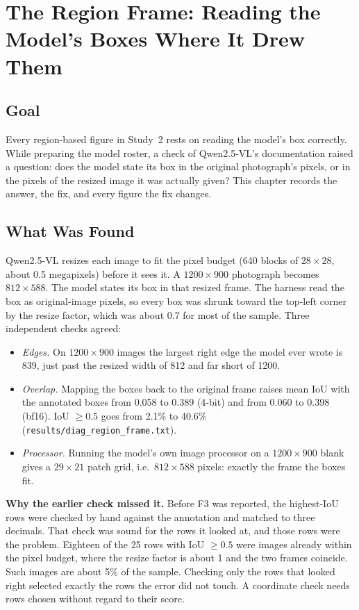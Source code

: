 \chapter{The Region Frame: Reading the Model's Boxes Where It Drew Them}
\label{chap:s2-8}

\section{Goal}

Every region-based figure in Study~2 rests on reading the model's box correctly. While preparing the
model roster, a check of Qwen2.5-VL's documentation raised a question: does the model state its box in the
original photograph's pixels, or in the pixels of the resized image it was actually given? This chapter
records the answer, the fix, and every figure the fix changes.

\section{What Was Found}

Qwen2.5-VL resizes each image to fit the pixel budget (640 blocks of $28\times28$, about 0.5 megapixels)
before it sees it. A $1200\times900$ photograph becomes $812\times588$. The model states its box in that
resized frame. The harness read the box as original-image pixels, so every box was shrunk toward the
top-left corner by the resize factor, which was about 0.7 for most of the sample. Three independent checks
agreed:
\begin{itemize}
\item \emph{Edges.} On $1200\times900$ images the largest right edge the model ever wrote is 839, just
past the resized width of 812 and far short of 1200.
\item \emph{Overlap.} Mapping the boxes back to the original frame raises mean IoU with the annotated
boxes from 0.058 to 0.389 (4-bit) and from 0.060 to 0.398 (bf16). IoU $\geq 0.5$ goes from 2.1\% to
40.6\% (\texttt{results/diag\_region\_frame.txt}).
\item \emph{Processor.} Running the model's own image processor on a $1200\times900$ blank gives a
$29\times21$ patch grid, i.e.\ $812\times588$ pixels: exactly the frame the boxes fit.
\end{itemize}

\textbf{Why the earlier check missed it.} Before F3 was reported, the highest-IoU rows were checked by
hand against the annotation and matched to three decimals. That check was sound for the rows it looked at,
and those rows were the problem. Eighteen of the 25 rows with IoU $\geq 0.5$ were images already within
the pixel budget, where the resize factor is about 1 and the two frames coincide. Such images are about 5\%
of the sample. Checking only the rows that looked right selected exactly the rows the error did not
touch. A coordinate check needs rows chosen without regard to their score.

